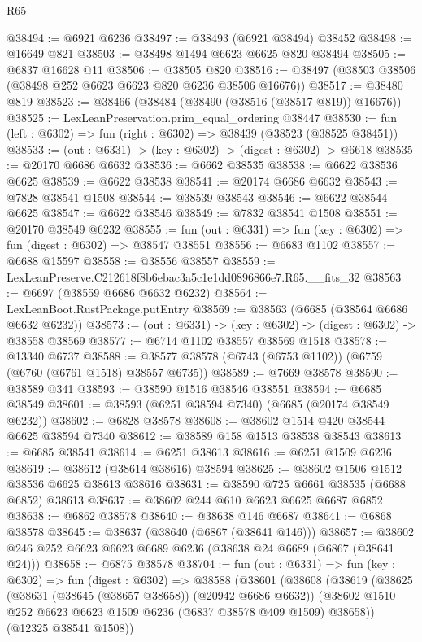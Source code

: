\begin{lexlean}{R65}
\begin{coremodule}
{@38494 := @6921 @6236
@38497 := @38493 (@6921 @38494) @38452
@38498 := @16649 @821
@38503 := @38498 @1494 @6623 @6625 @820 @38494
@38505 := @6837 @16628 @11
@38506 := @38505 @820
@38516 := @38497 (@38503 @38506 (@38498 @252 @6623 @6623 @820 @6236 @38506 @16676))
@38517 := @38480 @819
@38523 := @38466 (@38484 (@38490 (@38516 (@38517 @819)) @16676))
@38525 := LexLeanPreservation.prim_equal_ordering @38447
@38530 := fun (left : @6302) => fun (right : @6302) => @38439 (@38523 (@38525 @38451))
@38533 := (out : @6331) -> (key : @6302) -> (digest : @6302) -> @6618
@38535 := @20170 @6686 @6632
@38536 := @6662 @38535
@38538 := @6622 @38536 @6625
@38539 := @6622 @38538
@38541 := @20174 @6686 @6632
@38543 := @7828 @38541 @1508
@38544 := @38539 @38543
@38546 := @6622 @38544 @6625
@38547 := @6622 @38546
@38549 := @7832 @38541 @1508
@38551 := @20170 @38549 @6232
@38555 := fun (out : @6331) => fun (key : @6302) => fun (digest : @6302) => @38547 @38551
@38556 := @6683 @1102
@38557 := @6688 @15597
@38558 := @38556 @38557
@38559 := LexLeanPreserve.C212618f8b6ebac3a5c1e1dd0896866e7.R65.__fits_32
@38563 := @6697 (@38559 @6686 @6632 @6232)
@38564 := LexLeanBoot.RustPackage.putEntry
@38569 := @38563 (@6685 (@38564 @6686 @6632 @6232))
@38573 := (out : @6331) -> (key : @6302) -> (digest : @6302) -> @38558 @38569
@38577 := @6714 @1102 @38557 @38569 @1518
@38578 := @13340 @6737
@38588 := @38577 @38578 (@6743 (@6753 @1102)) (@6759 (@6760 (@6761 @1518) @38557 @6735))
@38589 := @7669 @38578
@38590 := @38589 @341
@38593 := @38590 @1516 @38546 @38551
@38594 := @6685 @38549
@38601 := @38593 (@6251 @38594 @7340) (@6685 (@20174 @38549 @6232))
@38602 := @6828 @38578
@38608 := @38602 @1514 @420 @38544 @6625 @38594 @7340
@38612 := @38589 @158 @1513 @38538 @38543
@38613 := @6685 @38541
@38614 := @6251 @38613
@38616 := @6251 @1509 @6236
@38619 := @38612 (@38614 @38616) @38594
@38625 := @38602 @1506 @1512 @38536 @6625 @38613 @38616
@38631 := @38590 @725 @6661 @38535 (@6688 @6852) @38613
@38637 := @38602 @244 @610 @6623 @6625 @6687 @6852
@38638 := @6862 @38578
@38640 := @38638 @146 @6687
@38641 := @6868 @38578
@38645 := @38637 (@38640 (@6867 (@38641 @146)))
@38657 := @38602 @246 @252 @6623 @6623 @6689 @6236 (@38638 @24 @6689 (@6867 (@38641 @24)))
@38658 := @6875 @38578
@38704 := fun (out : @6331) =>
  fun (key : @6302) =>
  fun (digest : @6302) =>
  @38588
    (@38601
      (@38608
        (@38619
          (@38625
            (@38631 (@38645 (@38657 @38658)) (@20942 @6686 @6632))
            (@38602 @1510 @252 @6623 @6623 @1509 @6236 (@6837 @38578 @409 @1509) @38658))
          (@12325 @38541 @1508))
}
\end{coremodule}
\end{lexlean}
